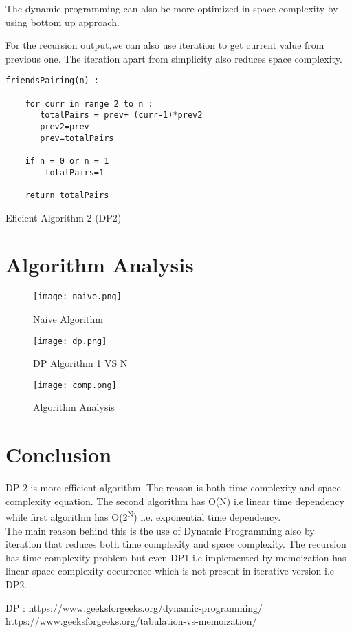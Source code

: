 \documentclass[conference]{IEEEtran}
\begin{document}
The dynamic programming can also be more optimized in space complexity by using bottom up approach.

\newline For the recursion output,we can also use iteration to get current value from previous one.
\newline The iteration apart from simplicity also reduces space complexity.

\bigskip

\begin{algorithm}[H]
\begin{lstlisting}
friendsPairing(n) :

    for curr in range 2 to n :
       totalPairs = prev+ (curr-1)*prev2
       prev2=prev
       prev=totalPairs

    if n = 0 or n = 1
        totalPairs=1

    return totalPairs

\end{lstlisting}

 \caption{Eficient Algorithm 2 (DP2)}
\end{algorithm}
\bigskip


\section{Algorithm Analysis}

\begin{figure}[h!]
\centerline{\texttt{[image: naive.png]}}
\caption{Naive Algorithm}
\centerline{\textit{}}
\label{fig:graph}
\end{figure}

\begin{figure}[h!]
\centerline{\texttt{[image: dp.png]}}
\caption{DP Algorithm 1 VS N}
\centerline{\textit{ }}
\label{fig:graph}
\end{figure}

\begin{figure}[h!]
\centerline{\texttt{[image: comp.png]}}
\caption{Algorithm Analysis}
\centerline{\textit{ }}
\label{fig:graph}
\end{figure}

\newpage

\section{Conclusion}
DP 2 is more efficient algorithm. The reason is both time complexity and space complexity equation.
The second algorithm has O(N) i.e linear time dependency while first algorithm has O(2\textsuperscript{N}) i.e. exponential time dependency. \\
The main reason behind this is the use of Dynamic Programming also by iteration that reduces both time complexity and space complexity. The recursion has time complexity problem but even DP1 i.e implemented by memoization has linear space complexity occurrence which is not present in iterative version i.e DP2.

\begin{thebibliography}{00}
DP : https://www.geeksforgeeks.org/dynamic-programming/
https://www.geeksforgeeks.org/tabulation-vs-memoization/
\end{thebibliography}
\end{document}
